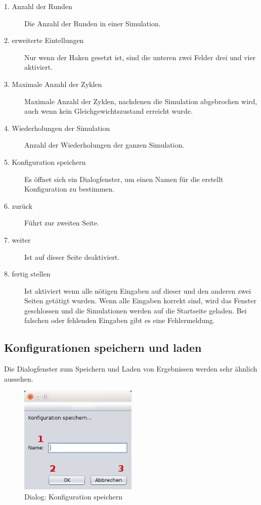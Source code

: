 \begin{description}

\item[1. Anzahl der Runden] Die Anzahl der Runden in einer Simulation. 

\item[2. erweiterte Eintellungen] Nur wenn der Haken gesetzt ist, sind die unteren zwei Felder drei und vier aktiviert.

\item[3. Maximale Anzahl der Zyklen] Maximale Anzahl der Zyklen, nachdenen die Simulation abgebrochen wird, auch wenn kein Gleichgewichtszustand erreicht wurde.

\item[4. Wiederholungen der Simulation] Anzahl der Wiederholungen der ganzen Simulation.

\item[5. Konfiguration speichern] Es öffnet sich ein Dialogfenster, um einen Namen für die erstellt Konfiguration zu bestimmen.

\item[6. zurück] Führt zur zweiten Seite.

\item[7. weiter] Ist auf dieser Seite deaktiviert.

\item[8. fertig stellen] Ist aktiviert wenn alle nötigen Eingaben auf dieser und den anderen zwei Seiten getätigt wurden. Wenn alle Eingaben korrekt sind, wird das Fenster geschlossen und die Simulationen werden auf die Startseite geladen. Bei falschen oder fehlenden Eingaben gibt es eine Fehlermeldung.

\end{description}


\subsection{Konfigurationen speichern und laden}

Die Dialogfenster zum Speichern und Laden von Ergebnissen werden sehr ähnlich aussehen.

\begin{figure}[hp] 
  \centering
     \includegraphics[width=0.5\textwidth]{GUI_Entwurf/KonfigSpeichern.png}
  \caption{Dialog: Konfiguration speichern}
  \label{fig:Bild5}
\end{figure}

